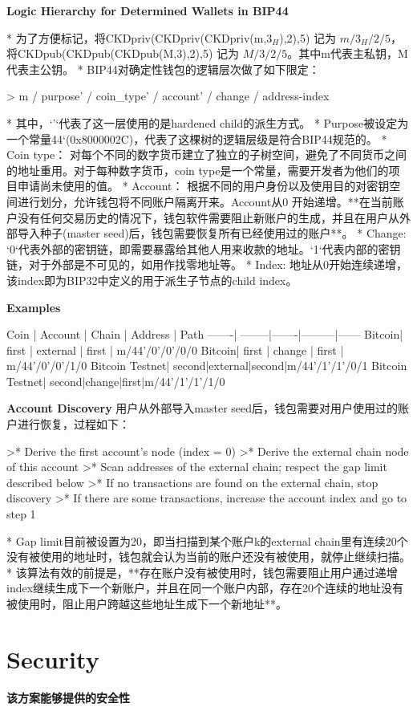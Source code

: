 \documentclass{article}
\begin{document}
\textbf{Logic Hierarchy for Determined Wallets in BIP44}

* 为了方便标记，将CKDpriv(CKDpriv(CKDpriv(m,$3_H$),2),5) 记为 $m/3_H/2/5$，将CKDpub(CKDpub(CKDpub(M,3),2),5) 记为 $M/3/2/5$。其中m代表主私钥，M代表主公钥。
* BIP44对确定性钱包的逻辑层次做了如下限定：

> m / purpose' / coin_type' / account' / change / address-index

* 其中，`'`代表了这一层使用的是hardened child的派生方式。
* Purpose被设定为一个常量44‘(0x8000002C)，代表了这棵树的逻辑层级是符合BIP44规范的。
* Coin type： 对每个不同的数字货币建立了独立的子树空间，避免了不同货币之间的地址重用。对于每种数字货币，coin type是一个常量，需要开发者为他们的项目申请尚未使用的值。
* Account： 根据不同的用户身份以及使用目的对密钥空间进行划分，允许钱包将不同账户隔离开来。Account从0 开始递增。**在当前账户没有任何交易历史的情况下，钱包软件需要阻止新账户的生成，并且在用户从外部导入种子(master seed)后，钱包需要恢复所有已经使用过的账户**。
* Change: `0`代表外部的密钥链，即需要暴露给其他人用来收款的地址。`1`代表内部的密钥链，对于外部是不可见的，如用作找零地址等。
* Index: 地址从0开始连续递增，该index即为BIP32中定义的用于派生子节点的child index。

\textbf{Examples}

Coin   | Account | Chain | Address | Path 
-------| --------|-------|---------|------
Bitcoin| first   | external | first | m/44'/0'/0'/0/0 
Bitcoin| first   | change | first | m/44'/0'/0'/1/0 
Bitcoin Testnet| second|external|second|m/44'/1'/1'/0/1
Bitcoin Testnet| second|change|first|m/44'/1'/1'/1/0

\textbf{Account Discovery}
用户从外部导入master seed后，钱包需要对用户使用过的账户进行恢复，过程如下：

>* Derive the first account's node (index = 0)
>* Derive the external chain node of this account
>* Scan addresses of the external chain; respect the gap limit described below
>* If no transactions are found on the external chain, stop discovery
>* If there are some transactions, increase the account index and go to step 1

* Gap limit目前被设置为20，即当扫描到某个账户k的external chain里有连续20个没有被使用的地址时，钱包就会认为当前的账户还没有被使用，就停止继续扫描。
* 该算法有效的前提是，**存在账户没有被使用时，钱包需要阻止用户通过递增index继续生成下一个新账户，并且在同一个账户内部，存在20个连续的地址没有被使用时，阻止用户跨越这些地址生成下一个新地址**。


\section{ Security}
\textbf{该方案能够提供的安全性}
\end{document}

